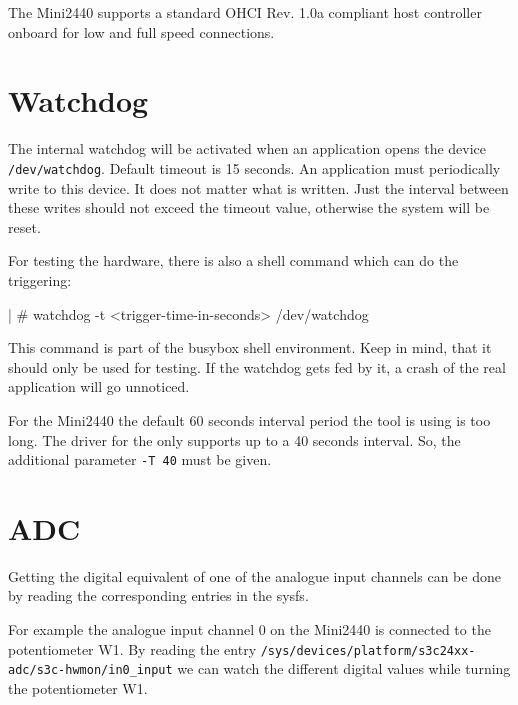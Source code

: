 The Mini2440 supports a standard OHCI Rev. 1.0a compliant host controller
onboard for low and full speed connections.

%
%


\newcommand{\perWatchdogTimeout}{15}

\section{Watchdog}			\label{sec:WD}

The internal watchdog will be activated when an application opens the device
\texttt{/dev/watchdog}. Default timeout is \perWatchdogTimeout{} seconds.
An application must periodically write to this device. It does not matter what
is written. Just the interval between these writes should not exceed the
timeout value, otherwise the system will be reset.

For testing the hardware, there is also a shell command which can do the
triggering:

\begin{ptxshell}{|}
# watchdog -t <trigger-time-in-seconds> /dev/watchdog
\end{ptxshell}

This command is part of the busybox shell environment. Keep in mind, that
it should only be used for testing. If the watchdog gets fed by it, a crash of
the real application will go unnoticed.

For the Mini2440 the default 60 seconds interval period the
tool is using is too long. The driver for the \perCpuName{} only supports up to
a 40 seconds interval. So, the additional parameter \texttt{-T 40} must be
given.


\section{ADC}							\label{sec:ADC}

Getting the digital equivalent of one of the analogue input channels can be
done by reading the corresponding entries in the sysfs.

For example the analogue input channel 0 on the Mini2440 is connected to the
potentiometer W1. By reading the entry
\texttt{/sys/devices/platform/s3c24xx-adc/s3c-hwmon/in0\_input}
we can watch the different digital values while turning the potentiometer W1.

